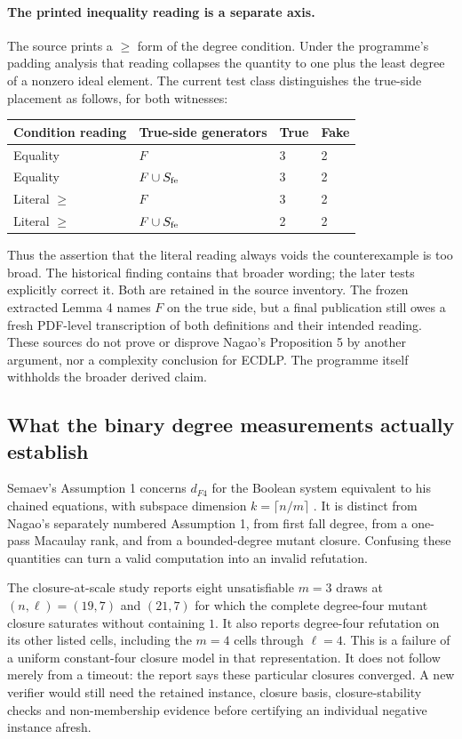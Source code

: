 \paragraph{The printed inequality reading is a separate axis.}
The source prints a $\geq$ form of the degree condition. Under the
programme's padding analysis that reading collapses the quantity to one
plus the least degree of a nonzero ideal element. The current test class
 distinguishes the true-side
placement as follows, for both witnesses:
\begin{center}
\begin{tabular}{llll}
\toprule
Condition reading & True-side generators & True & Fake \\
\midrule
Equality & $F$ & 3 & 2 \\
Equality & $F\cup S_{\rm fe}$ & 3 & 2 \\
Literal $\geq$ & $F$ & 3 & 2 \\
Literal $\geq$ & $F\cup S_{\rm fe}$ & 2 & 2 \\
\bottomrule
\end{tabular}
\end{center}
Thus the assertion that the literal reading always voids the
counterexample is too broad. The historical finding
 contains that broader wording; the later tests
explicitly correct it. Both are retained in the source inventory. The
frozen extracted Lemma 4 names $F$ on the true side, but a final
publication still owes a fresh PDF-level transcription of both definitions
and their intended reading. These sources do not prove or disprove
Nagao's Proposition 5 by another argument, nor a complexity conclusion
for ECDLP. The programme itself withholds the broader derived claim.

\subsection{What the binary degree measurements actually establish}

Semaev's Assumption 1 concerns $d_{F4}$ for the Boolean system equivalent
to his chained equations, with subspace dimension $k=\lceil n/m\rceil$
\cite{semaev2015}. It is distinct from Nagao's separately numbered
Assumption 1, from first fall degree, from a one-pass Macaulay rank, and
from a bounded-degree mutant closure. Confusing these quantities can
turn a valid computation into an invalid refutation.

The closure-at-scale study \cite{closureScale} reports eight unsatisfiable
$m=3$ draws at $(n,\ell)=(19,7)$ and $(21,7)$ for which the complete
degree-four mutant closure saturates without containing $1$. It also
reports degree-four refutation on its other listed cells, including the
$m=4$ cells through $\ell=4$. This is a failure of a uniform
constant-four closure model in that representation. It does not follow
merely from a timeout: the report says these particular closures
converged. A new verifier would still need the retained instance, closure
basis, closure-stability checks and non-membership evidence before
certifying an individual negative instance afresh.

